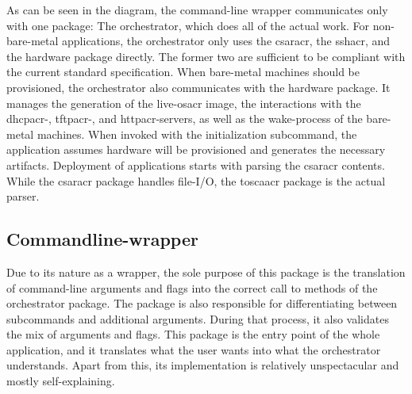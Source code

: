 As can be seen in the diagram, the command-line wrapper communicates only with one package: The orchestrator, which does all of the actual work. For non-bare-metal applications, the orchestrator only uses the \gls{csaracr}, the \gls{sshacr}, and the hardware package directly. The former two are sufficient to be compliant with the current standard specification. When bare-metal machines should be provisioned, the orchestrator also communicates with the hardware package. It manages the generation of the live-\gls{osacr} image, the interactions with the \gls{dhcpacr}-, \gls{tftpacr}-, and \gls{httpacr}-servers, as well as the wake-process of the bare-metal machines.
\newline
When invoked with the initialization subcommand, the application assumes hardware will be provisioned and generates the necessary artifacts.
\newline
Deployment of applications starts with parsing the \gls{csaracr} contents. While the \gls{csaracr} package handles file-I/O, the \gls{toscaacr} package is the actual parser.

\subsection{Commandline-wrapper}
Due to its nature as a wrapper, the sole purpose of this package is the translation of command-line arguments and flags into the correct call to methods of the orchestrator package. The package is also responsible for differentiating between subcommands and additional arguments. During that process, it also validates the mix of arguments and flags.
\newline
This package is the entry point of the whole application, and it translates what the user wants into what the orchestrator understands. Apart from this, its implementation is relatively unspectacular and mostly self-explaining.

